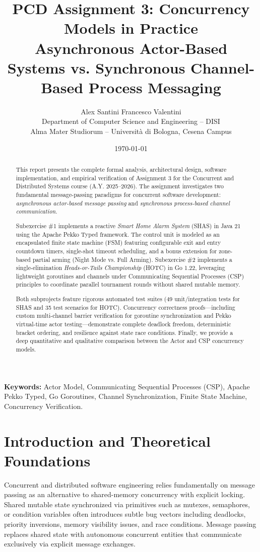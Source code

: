 \documentclass[11pt,a4paper]{article}
\title{\vspace{-1.5cm}\Large\bfseries PCD Assignment 3: Concurrency Models in Practice\\
\large Asynchronous Actor-Based Systems vs. Synchronous Channel-Based Process Messaging}
\author{Alex Santini \quad Francesco Valentini\\
\small Department of Computer Science and Engineering -- DISI\\
\small Alma Mater Studiorum -- Università di Bologna, Cesena Campus}
\date{\today}
\begin{document}
\maketitle

\begin{abstract}
This report presents the complete formal analysis, architectural design, software implementation, and empirical verification of Assignment 3 for the Concurrent and Distributed Systems course (A.Y. 2025--2026). The assignment investigates two fundamental message-passing paradigms for concurrent software development: \emph{asynchronous actor-based message passing} and \emph{synchronous process-based channel communication}. 

Subexercise \#1 implements a reactive \emph{Smart Home Alarm System} (SHAS) in Java 21 using the Apache Pekko Typed framework. The control unit is modeled as an encapsulated finite state machine (FSM) featuring configurable exit and entry countdown timers, single-shot timeout scheduling, and a bonus extension for zone-based partial arming (Night Mode vs. Full Arming). Subexercise \#2 implements a single-elimination \emph{Heads-or-Tails Championship} (HOTC) in Go 1.22, leveraging lightweight goroutines and channels under Communicating Sequential Processes (CSP) principles to coordinate parallel tournament rounds without shared mutable memory. 

Both subprojects feature rigorous automated test suites (49 unit/integration tests for SHAS and 35 test scenarios for HOTC). Concurrency correctness proofs—including custom multi-channel barrier verification for goroutine synchronization and Pekko virtual-time actor testing—demonstrate complete deadlock freedom, deterministic bracket ordering, and resilience against state race conditions. Finally, we provide a deep quantitative and qualitative comparison between the Actor and CSP concurrency models.
\end{abstract}

\textbf{Keywords:} Actor Model, Communicating Sequential Processes (CSP), Apache Pekko Typed, Go Goroutines, Channel Synchronization, Finite State Machine, Concurrency Verification.

\section{Introduction and Theoretical Foundations}

Concurrent and distributed software engineering relies fundamentally on message passing as an alternative to shared-memory concurrency with explicit locking. Shared mutable state synchronized via primitives such as mutexes, semaphores, or condition variables often introduces subtle bug vectors including deadlocks, priority inversions, memory visibility issues, and race conditions. Message passing replaces shared state with autonomous concurrent entities that communicate exclusively via explicit message exchanges. 
\end{document}
